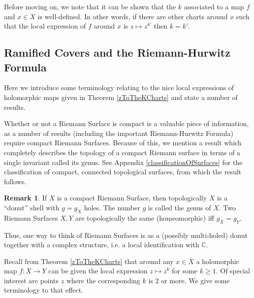 \documentclass[12pt]{book}%
\theoremstyle{plain}
\theoremstyle{definition}
\newtheorem{remark}[theorem]{Remark}
\theoremstyle{remark}
\def\to{\rightarrow}
\def\bC{{\mathbb{C}}}
\begin{document}

Before moving on, we note that it can be shown that the $k$ associated to a map $f$ and $x\in X$ is well-defined. In other words, if there are other charts around $x$ such that the local expression of $f$ around $x$ is $z \mapsto z^{k'}$ then $k=k'$.

\subsection{Ramified Covers and the Riemann-Hurwitz Formula}
Here we introduce some terminology relating to the nice local expressions of holomorphic maps given in Theorem \ref{zToTheKCharts} and state a number of results.

Whether or not a Riemann Surface is compact is a valuable piece of information, as a number of results (including the important Riemann-Hurwitz Formula) require compact Riemann Surfaces. Because of this, we mention a result which completely describes the topology of a compact Riemann surface in terms of a single invariant called its genus. See Appendix \ref{classificationOfSurfaces} for the classification of compact, connected topological surfaces, from which the result follows.

\begin{remark}
If $X$ is a compact Riemann Surface, then topologically $X$ is a ``donut'' shell with $g=g_X$ holes. The number $g$ is called the genus of $X$. Two Riemann Surfaces $X,Y$ are topologically the same (homeomorphic) iff $g_X=g_Y$.
\end{remark} 

\begin{figure}
\label{donutsFigure}
\end{figure}

Thus, one way to think of Riemann Surfaces is as a (possibly multi-holed) donut together with a complex structure, i.e. a local identification with $\bC$.

Recall from Theorem \ref{zToTheKCharts} that around any $x \in X$ a holomorphic map $f:X \to Y$ can be given the local expression $z \mapsto z^k$ for some $k \geq 1$. Of special interest are points $z$ where the corresponding $k$ is $2$ or more. We give some terminology to that effect.
\end{document}
